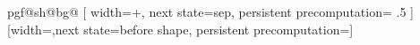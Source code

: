 {{    \pgf@xa\pgf@lib@shapedecoration@width\relax%
    \pgf@xb\pgfutil@tempdima%
    \pgfmathdivide@{\pgfmath@tonumber{\pgf@xa}}{\pgfmath@tonumber{\pgf@xb}}%
    \expandafter\pgftransformxscale\expandafter{\pgfmathresult}%
    \pgf@ya\pgf@lib@shapedecoration@height\relax%
    \pgf@yb\pgfutil@tempdimb%
    \pgfmathdivide@{\pgfmath@tonumber{\pgf@ya}}{\pgfmath@tonumber{\pgf@yb}}%
    \expandafter\pgftransformyscale\expandafter{\pgfmathresult}%
    \pgf@lib@shapedecoration@points%
    \pgf@lib@shapedecoration@macros%
    \csname pgf@sh@bg@\endcsname%
  }
  [
    width=+\pgf@lib@shapedecoration@aftershape,
    next state=sep,
    persistent precomputation=
    {
      \ifpgf@lib@shapedecoration@betweenborders%
        \pgf@x\pgf@lib@shapedecoration@width\relax%
        \pgf@x.5\pgf@x%
        \edef\pgf@lib@shapedecoration@aftershape{\the\pgf@x}%
      \else%
        \edef\pgf@lib@shapedecoration@aftershape{0pt}%
      \fi%
    }
  ]
  {}
  [width=\pgf@lib@shapedecoration@sep,next state=before shape,
              persistent precomputation=\def\pgf@lib@shapedecoration@beforeshape{0pt}]
  {}
  {
    \pgfpathmoveto{\pgfpointdecoratedpathlast}%
  }
}

\def\pgf@lib@shapedecoration@setkeyword,{%
  \pgfutil@ifnextchar\pgf@stop{\def\pgf@temp{}\pgf@lib@@@shapedecoration@setkeyword}{\pgf@lib@@shapedecoration@setkeyword}%
}
\def\pgf@lib@@shapedecoration@setkeyword#1,{\def\pgf@temp{#1}\pgf@lib@@@shapedecoration@setkeyword}
\def\pgf@lib@@@shapedecoration@setkeyword\pgf@stop{%
  \ifx\pgf@temp\pgf@lib@shapedecoration@borderstext%
    \pgf@lib@shapedecoration@betweenborderstrue%
  \else%
    \pgf@lib@shapedecoration@betweenbordersfalse%
  \fi%
}



\endinput